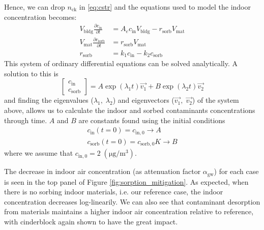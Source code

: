 Hence, we can drop $n_\mathrm{ck}$ in \eqref{eq:cstr} and the equations used to model the indoor concentration becomes:
\begin{align}
  V_\mathrm{bldg} \frac{\partial c_\mathrm{in}}{\partial t} &= A_e c_\mathrm{in} V_\mathrm{bldg} - r_\mathrm{sorb} V_\mathrm{mat}\label{eq:cstr} \\
  V_\mathrm{mat} \frac{\partial c_\mathrm{sorb}}{\partial t} &= r_\mathrm{sorb} V_\mathrm{mat}\label{eq:sorbed_concentration} \\
  r_\mathrm{sorb} &= k_1 c_\mathrm{in} - k_2 c_\mathrm{sorb}\label{eq:sorption_rate}
\end{align}
This system of ordinary differential equations can be solved analytically.
A solution to this is
\begin{equation}
  \begin{bmatrix}
    c_\mathrm{in} \\ c_\mathrm{sorb}
  \end{bmatrix} =
  A \exp{(\lambda_1 t)} \vec{v_1} + B \exp{(\lambda_2 t)} \vec{v_2}
\end{equation}
and finding the eigenvalues ($\lambda_1, \; \lambda_2$) and eigenvectors ($\vec{v_1}, \; \vec{v_2}$) of the system above, allows us to calculate the indoor and sorbed contaminants concentrations through time.
$A$ and $B$ are constants found using the initial conditions
\begin{align}
  c_\mathrm{in}(t=0) = c_\mathrm{in,0} \rightarrow A \\
  c_\mathrm{sorb}(t=0) = c_\mathrm{sorb,0} K \rightarrow B
\end{align}
where we assume that $c_\mathrm{in,0} = 2 \; \mathrm{(\mu g/m^3)}$.\par

The decrease in indoor air concentration (as attenuation factor $\alpha_\mathrm{gw}$) for each case is seen in the top panel of Figure \ref{fig:sorption_mitigation}.
As expected, when there is no sorbing indoor materials, i.e. our reference case, the indoor concentration decreases log-linearily.
We can also see that contaminant desorption from materials maintains a higher indoor air concentration relative to reference, with cinderblock again shown to have the great impact.\par

